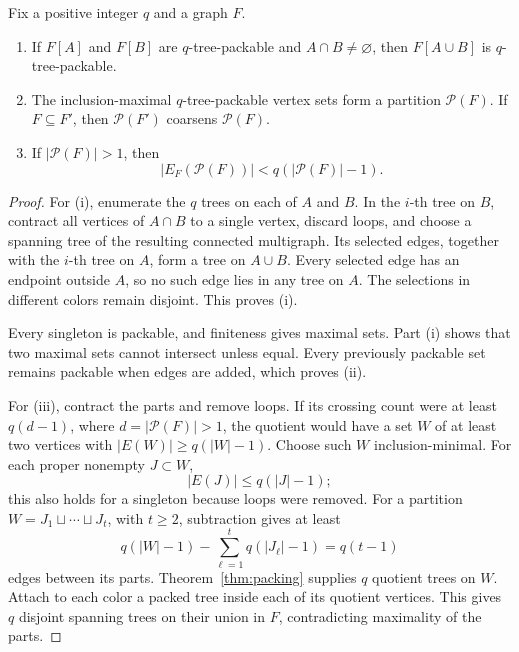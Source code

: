\begin{lemma}\label{lem:packing-parts}
Fix a positive integer \(q\) and a graph \(F\).
\begin{enumerate}[label=\textup{(\roman*)}]
\item If \(F[A]\) and \(F[B]\) are \(q\)-tree-packable and
\(A\cap B\ne\varnothing\), then \(F[A\cup B]\) is
\(q\)-tree-packable.
\item The inclusion-maximal \(q\)-tree-packable vertex sets form a
partition \(\mathcal P(F)\). If \(F\subseteq F'\), then
\(\mathcal P(F')\) coarsens \(\mathcal P(F)\).
\item If \(|\mathcal P(F)|>1\), then
\[
 |E_F(\mathcal P(F))|<q(|\mathcal P(F)|-1).
\]
\end{enumerate}
\end{lemma}
\begin{proof}
For (i), enumerate the \(q\) trees on each of \(A\) and \(B\).
In the \(i\)-th tree on \(B\), contract all vertices of \(A\cap B\)
to a single vertex, discard loops, and choose a spanning tree of
the resulting connected multigraph. Its selected edges, together
with the \(i\)-th tree on \(A\), form a tree on \(A\cup B\).
Every selected edge has an endpoint outside \(A\), so no such edge
lies in any tree on \(A\). The selections in different colors
remain disjoint. This proves (i).

Every singleton is packable, and finiteness gives maximal sets.
Part (i) shows that two maximal sets cannot intersect unless equal.
Every previously packable set remains packable when edges are added,
which proves (ii).

For (iii), contract the parts and remove loops.
If its crossing count were at least \(q(d-1)\), where
\(d=|\mathcal P(F)|>1\), the quotient would have a set
\(W\) of at least two vertices with
\(|E(W)|\ge q(|W|-1)\).
Choose such \(W\) inclusion-minimal. For each proper nonempty
\(J\subset W\),
\[
 |E(J)|\le q(|J|-1);
\]
this also holds for a singleton because loops were removed.
For a partition \(W=J_1\sqcup\cdots\sqcup J_t\), with \(t\ge2\),
subtraction gives at least
\[
 q(|W|-1)-\sum_{\ell=1}^t q(|J_\ell|-1)=q(t-1)
\]
edges between its parts. Theorem~\ref{thm:packing} supplies \(q\)
quotient trees on \(W\).
Attach to each color a packed tree inside each of its quotient
vertices. This gives \(q\) disjoint spanning trees on their union
in \(F\), contradicting maximality of the parts.
\end{proof}
